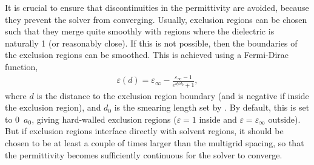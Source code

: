 \documentclass[letterpaper,10pt,english]{sphinxmanual}
\begin{document}
It is crucial to ensure that discontinuities in the permittivity are
avoided, because they prevent the solver from converging. Usually,
exclusion regions can be chosen such that they merge quite smoothly with
regions where the dielectric is naturally 1 (or reasonably close). If
this is not possible, then the boundaries of the exclusion regions can
be smoothed. This is achieved using a Fermi-Dirac function,
\begin{equation*}
\begin{split}\varepsilon(d) = \varepsilon_\infty - \frac{\varepsilon_\infty - 1}{e^{d/d_0} + 1},\end{split}
\end{equation*}
where \(d\) is the distance to the exclusion region boundary (and
is negative if inside the exclusion region), and \(d_0\) is the
smearing length set by . By default,
this is set to 0 \(a_0\), giving hard-walled exclusion regions
(\(\varepsilon = 1\) inside and
\(\varepsilon = \varepsilon_\infty\) outside). But if exclusion
regions interface directly with solvent regions, it should be chosen to
be at least a couple of times larger than the multigrid spacing, so that
the permittivity becomes sufficiently continuous for the solver to
converge.
\end{document}
